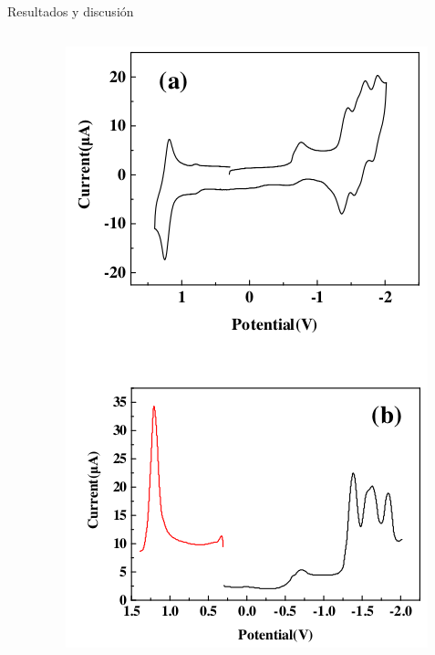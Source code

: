 \documentclass[handout]{beamer}
\begin{document}
\begin{frame}{Resultados y discusi\'on}
\begin{columns}
\begin{column}{0.6\textwidth}
		\end{column}
		\begin{column}{0.4\textwidth}
			\begin{figure}[h]
				\centering
				\includegraphics[width=\linewidth]{sources/cv}
			\end{figure}
		\end{column}
	\end{columns}
\end{frame}
\end{document}
